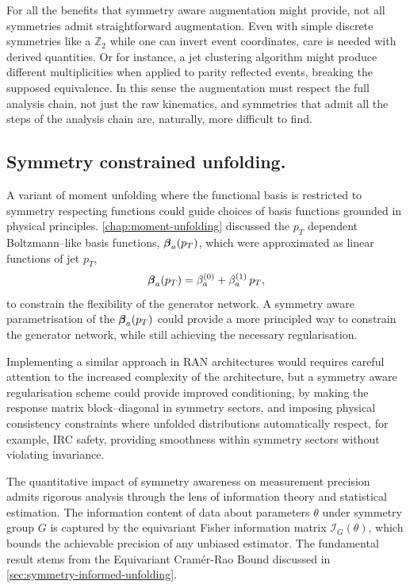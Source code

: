        For all the benefits that symmetry aware augmentation might provide, not all symmetries admit straightforward augmentation.
        Even with simple discrete symmetries like a \(\mathbb{Z}_2\) while one can invert event coordinates, care is needed with derived quantities.
        Or for instance, a jet clustering algorithm might produce different multiplicities when applied to parity reflected events, breaking the supposed equivalence.
        In this sense the augmentation must respect the full analysis chain, not just the raw kinematics, and symmetries that admit all the steps of the analysis chain are, naturally, more difficult to find.

    \subsection{Symmetry constrained unfolding.}
        A variant of moment unfolding where the functional basis is restricted to symmetry respecting functions could guide choices of basis functions grounded in physical principles.
        \cref{chap:moment-unfolding} discussed the \(p_T\) dependent Boltzmann--like basis functions, \(\vb*{\beta}_a(p_T)\), which were approximated as linear functions of jet \(p_T\),
        \[
            \vb*{\beta}_a(p_T) = {\beta}_a^{(0)} + {\beta}_a^{(1)}\,p_T,
        \]
        to constrain the flexibility of the generator network.
        A symmetry aware parametrisation of the \(\vb*{\beta}_a(p_T)\) could provide a more principled way to constrain the generator network, while still achieving the necessary regularisation.
        
        Implementing a similar approach in RAN architectures would requires careful attention to the increased complexity of the architecture, but a symmetry aware regularisation scheme could provide improved conditioning, by making the response matrix block--diagonal in symmetry sectors, and imposing physical consistency constraints where unfolded distributions automatically respect, for example, IRC safety, providing smoothness within symmetry sectors without violating invariance.

        The quantitative impact of symmetry awareness on measurement precision admits rigorous analysis through the lens of information theory and statistical estimation.
        The information content of data about parameters \(\theta\) under symmetry group \(G\) is captured by the equivariant Fisher information matrix \(\mathcal{I}_G(\theta)\), which bounds the achievable precision of any unbiased estimator.
        The fundamental result stems from the Equivariant Cramér-Rao Bound discussed in \cref{sec:symmetry-informed-unfolding}.
        
